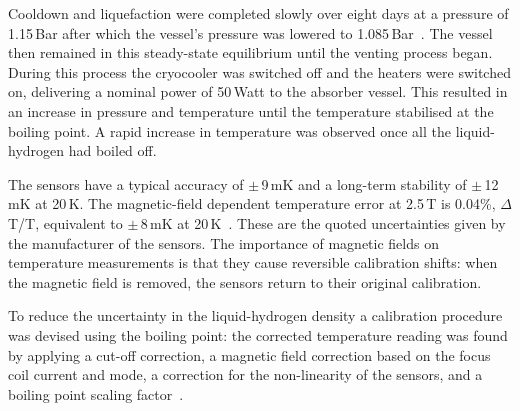 Cooldown and liquefaction were completed slowly over eight days at a pressure of 1.15\,Bar after which the vessel's pressure was lowered to 1.085\,Bar~\cite{1748-0221-13-09-T09008}. The vessel then remained in this steady-state equilibrium until the venting process began. During this process the cryocooler was switched off and the heaters were switched on, delivering a nominal power of 50\,Watt to the absorber vessel. This resulted in an increase in pressure and temperature until the temperature stabilised at the boiling point. A rapid increase in temperature was observed once all the liquid-hydrogen had boiled off.

The sensors have a typical accuracy of $\mathrm{\pm}$\,9\,mK and a long-term stability of $\mathrm{\pm}$\,12\,mK at 20\,K. The magnetic-field dependent temperature error at 2.5\,T is 0.04\%, $\Delta$T/T, equivalent to $\mathrm{\pm}$\,8\,mK at 20\,K~\cite{CernoxRTDs}\cite{TemperatureMeasurement}. These are the quoted uncertainties given by the manufacturer of the sensors. The importance of magnetic fields on temperature measurements is that they cause reversible calibration shifts: when the magnetic field is removed, the sensors return to their original calibration.

To reduce the uncertainty in the liquid-hydrogen density a calibration procedure was devised using the boiling point: the corrected temperature reading was found by applying a cut-off correction, a magnetic field correction based on the focus coil current and mode, a correction for the non-linearity of the sensors, and a boiling point scaling factor~\cite{NOTE524}. 
%
%


